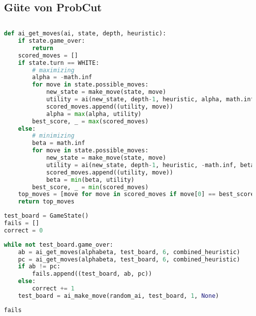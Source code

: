 \hypertarget{guxfcte-von-probcut}{%
\subsection{Güte von ProbCut}\label{guxfcte-von-probcut}}

\begin{lstlisting}[language=Python]
%run othello_ai.ipynb
\end{lstlisting}

\begin{lstlisting}[language=Python]
def ai_get_moves(ai, state, depth, heuristic):
    if state.game_over:
        return
    scored_moves = []
    if state.turn == WHITE:
        # maximizing
        alpha = -math.inf
        for move in state.possible_moves:
            new_state = make_move(state, move)
            utility = ai(new_state, depth-1, heuristic, alpha, math.inf)
            scored_moves.append((utility, move))
            alpha = max(alpha, utility)
        best_score, _ = max(scored_moves)
    else:
        # minimizing
        beta = math.inf
        for move in state.possible_moves:
            new_state = make_move(state, move)
            utility = ai(new_state, depth-1, heuristic, -math.inf, beta)
            scored_moves.append((utility, move))
            beta = min(beta, utility)
        best_score, _ = min(scored_moves)
    top_moves = [move for move in scored_moves if move[0] == best_score]
    return top_moves
\end{lstlisting}

\begin{lstlisting}[language=Python]
test_board = GameState()
fails = []
correct = 0
\end{lstlisting}

\begin{lstlisting}[language=Python]
while not test_board.game_over:
    ab = ai_get_moves(alphabeta, test_board, 6, combined_heuristic)
    pc = ai_get_moves(alphabeta, test_board, 6, combined_heuristic)
    if ab != pc:
        fails.append((test_board, ab, pc))
    else:
        correct += 1
    test_board = ai_make_move(random_ai, test_board, 1, None)
\end{lstlisting}

\begin{lstlisting}[language=Python]
fails
\end{lstlisting}

